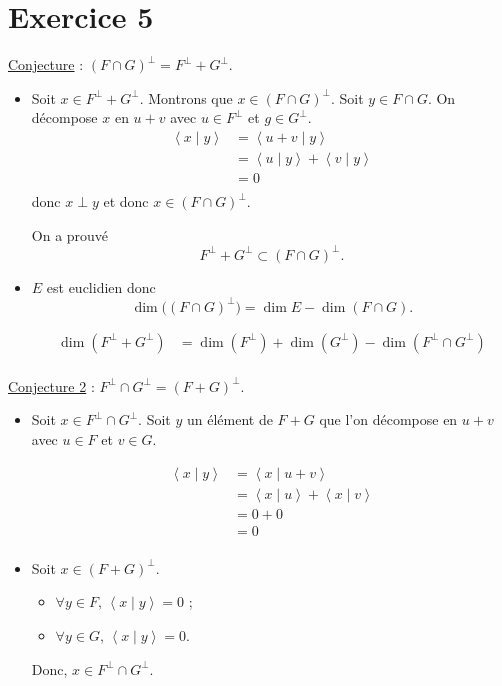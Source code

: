 \part{Exercice 5}

\underline{Conjecture} : $(F \cap G)^\perp = F^\perp + G^\perp$.

\begin{itemize}
	\item Soit $x \in F^\perp + G^\perp$. Montrons que $x \in (F \cap G)^\perp$.
		Soit $y \in F \cap G$. On décompose $x$ en $u + v$ avec $u \in F^\perp$ et $g \in G^\perp$.
		\begin{align*}
			\left<x \mid y \right> &= \left<u+v \mid y \right>\\
			&= \left<u \mid y \right> + \left<v \mid y \right> \\
			&= 0 \\
		\end{align*}
		donc $x \perp y$ et donc $x \in (F \cap G)^{\perp}$.

		On a prouvé \[
			F^\perp + G^{\perp} \subset (F \cap G)^{\perp}
		.\]
	\item $E$ est euclidien donc
		\[
			\dim\big((F\cap G)^{\perp}\big) = \dim E - \dim (F \cap G)
		.\]

		\begin{align*}
			\dim(F^{\perp} + G^{\perp}) &= \dim(F^{\perp}) + \dim(G^{\perp}) - \dim(F^{\perp} \cap G^{\perp}) \\
		\end{align*}
\end{itemize}

\underline{Conjecture 2} : $F^\perp \cap G^\perp = (F + G)^\perp$.


\begin{itemize}
	\item  Soit $x \in F^\perp \cap G^\perp$. Soit $y$ un élément de $F + G$ que l'on décompose en $u+v$ avec $u \in F$ et $v \in G$.

		\begin{align*}
			\left<x \mid y \right> &= \left<x \mid u+v \right> \\
			&= \left<x \mid u \right> + \left<x \mid v \right> \\
			&= 0 + 0 \\
			&= 0 \\
		\end{align*}
	\item Soit $x \in (F + G)^\perp$.
		\begin{itemize}
			\item $\forall y \in F,\,\left<x \mid y \right> = 0$ ;
			\item $\forall y \in G,\,\left<x \mid y \right> = 0$.
		\end{itemize}
		Donc, $x \in F^\perp \cap G^\perp$.
\end{itemize}

